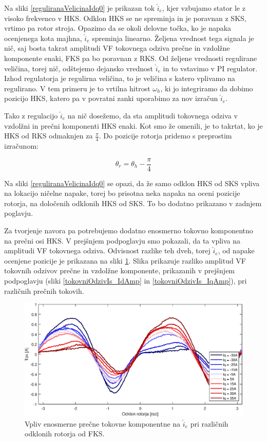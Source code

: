 \documentclass[a4paper,twoside,openright,12pt,slovene]{book}
\begin{document}
Na sliki \ref{reguliranaVelicinaIdq0} je prikazan tok $\hat{i}_{e}$,  kjer vzbujamo stator le z visoko frekvenco v HKS. Odklon HKS se ne spreminja in je poravnan z SKS, vrtimo pa rotor stroja. Opazimo
da se okoli delovne točka, ko je napaka ocenjenega kota majhna, $\hat{i}_{e}$ spreminja linearno. Željena vrednost tega signala je nič, saj bosta takrat amplitudi VF tokovnega odziva prečne in
vzdolžne komponente enaki, FKS pa bo poravnan z RKS. Od željene vrednosti regulirane veličina, torej nič, odštejemo dejansko vrednost $\hat{i}_{e}$ in to vstavimo v PI regulator. Izhod regulatorja je
regulirna veličina, to je veličina s katero vplivamo na regulirano. V tem primeru je to vrtilna hitrost $\omega_h$, ki jo integriramo da dobimo pozicijo HKS, katero pa v povratni zanki uporabimo za
nov izračun $\hat{i}_{e}$. 

Tako z regulacijo $\hat{i}_{e}$ na nič dosežemo, da sta amplitudi tokovnega odziva v vzdolžni in prečni komponenti HKS enaki. Kot smo že omenili, je to takrtat, ko je HKS od RKS odmaknjen za
$\frac{\pi}{4}$. Do pozicije rotorja pridemo s preprostim izračunom:

\begin{equation}
    \theta_{r} = \theta_{h} - \frac{\pi}{4}
\end{equation}

Na sliki \ref{reguliranaVelicinaIdq0} se opazi, da že samo odklon HKS od SKS vpliva na lokacijo ničelne napake, torej bo prisotna neka napaka na oceni pozicije rotorja, na določenih odklonih HKS od
SKS. To bo dodatno prikazano v zadnjem poglavju.

Za tvorjenje navora pa potrebujemo dodatno enosmerno tokovno komponentno na prečni osi HKS. V prejšnjem podpoglavju smo pokazali, da ta vpliva na amplitudi VF tokovnega odziva. Odvisnost razlike teh
dveh, torej $\hat{i}_{e}$, od napake ocenjene pozicije je prikazana na sliki \ref{reguliranaVelicinaIs}. Slika prikazuje razliko amplitud VF tokovnih odzivov prečne in vzdolžne komponente, prikazanih
v prejšnjem podpoglavju (sliki \ref{tokovniOdzivIs_IdAmp} in \ref{tokovniOdzivIs_IqAmp}), pri različnih prečnih tokovih. 

\begin{figure}[!htbp]
    \centering
    \includegraphics[width=1\columnwidth]{Slike/reguliranaVelicinaIs.eps}
    \caption{\label{reguliranaVelicinaIs} Vpliv enosmerne prečne tokovne komponentne na $\hat{i}_{e}$ pri različnih odklonih rotorja od FKS.}
\end{figure}
\end{document}
